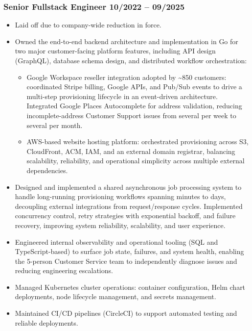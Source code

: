 \documentclass[10pt]{article}
\begin{document}
\subsubsection{Senior Fullstack Engineer \hfill 10/2022 -- 09/2025}
\begin{itemize}
  \item Laid off due to company-wide reduction in force.
  \item Owned the end-to-end backend architecture and implementation in Go for two major customer-facing platform features, including API design (GraphQL), database schema design, and distributed workflow orchestration:
    \begin{itemize}
      \item Google Workspace reseller integration adopted by \textasciitilde850 customers: coordinated Stripe billing, Google APIs, and Pub/Sub events to drive a multi-step provisioning lifecycle in an event-driven architecture. Integrated Google Places Autocomplete for address validation, reducing incomplete-address Customer Support issues from several per week to several per month.
      \item AWS-based website hosting platform: orchestrated provisioning across S3, CloudFront, ACM, IAM, and an external domain registrar, balancing scalability, reliability, and operational simplicity across multiple external dependencies.
    \end{itemize}
  \item Designed and implemented a shared asynchronous job processing system to handle long-running provisioning workflows spanning minutes to days, decoupling external integrations from request/response cycles. Implemented concurrency control, retry strategies with exponential backoff, and failure recovery, improving system reliability, scalability, and user experience.
  \item Engineered internal observability and operational tooling (SQL and TypeScript-based) to surface job state, failures, and system health, enabling the 5-person Customer Service team to independently diagnose issues and reducing engineering escalations.
  \item Managed Kubernetes cluster operations: container configuration, Helm chart deployments, node lifecycle management, and secrets management.
  \item Maintained CI/CD pipelines (CircleCI) to support automated testing and reliable deployments.
\end{itemize}
\end{document}
